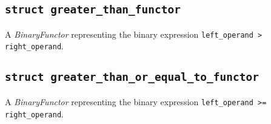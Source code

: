 \documentclass[oneside]{book}
\begin{document}
\subsection{\texttt{struct greater\_than\_functor}}
A \textit{BinaryFunctor} representing the binary expression \verb|left_operand > right_operand|.

\subsection{\texttt{struct greater\_than\_or\_equal\_to\_functor}}
A \textit{BinaryFunctor} representing the binary expression \verb|left_operand >= right_operand|.
\end{document}
